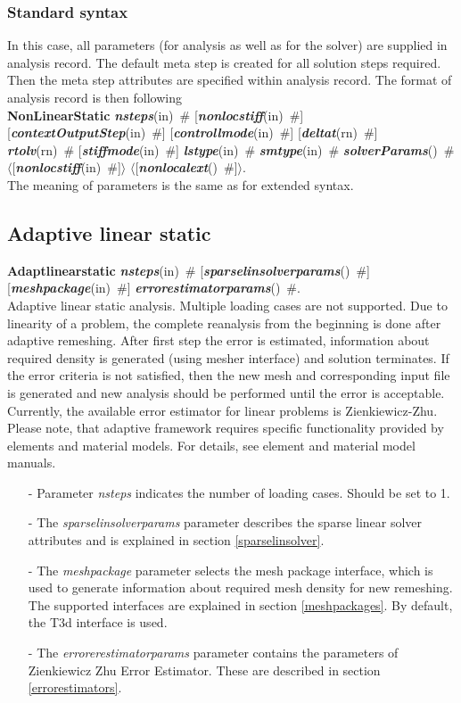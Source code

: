 \documentclass[draft]{article}
\newcommand{\param}[1]{{\em #1}}
\newcommand{\keywordnotype}[1]{\mbox{{\it{\bf{#1}}}}}
\newcommand{\keyword}[2]{\mbox{{\keywordnotype{#1}\tiny (#2)}}}
\newcommand{\entKeywordInst}[1]{\mbox{{\bf{{#1}}}}}
\newcommand{\field}[2]{\mbox{\keyword{#1}{#2}~\#}}
\newcommand{\optField}[2]{\mbox{[\field{#1}{#2}]}}
\newcommand{\PoptField}[2]{\mbox{$\langle$[\field{#1}{#2}]$\rangle$}}
\begin{document}
\subsubsection{Standard syntax}
In this case, all parameters (for analysis as well as for the solver)
are supplied in analysis record. The default meta step is created for
all solution steps required. Then the meta step attributes are
specified within analysis record. The format of analysis record is
then following\\
\entKeywordInst{NonLinearStatic} \field{nsteps}{in}
\optField{nonlocstiff}{in}\\
 \optField{contextOutputStep}{in} \optField{controllmode}{in} \optField{deltat}{rn}\\
\field{rtolv}{rn} \optField{stiffmode}{in} \field{lstype}{in}
\field{smtype}{in} \field{solverParams}{}\\
\PoptField{nonlocstiff}{in} \PoptField{nonlocalext}{}.\\ The
meaning of parameters is the same as for extended syntax.

%
\subsection{Adaptive linear static}
\label{AdaptiveLinearStatic}
\entKeywordInst{Adaptlinearstatic} \field{nsteps}{in}
\optField{sparselinsolverparams}{} \\\optField{meshpackage}{in} \field{errorestimatorparams}{}.\\
Adaptive linear static analysis. Multiple loading cases are not
supported. Due to linearity of a problem, the complete reanalysis from
the beginning is done after adaptive remeshing.
After first step the error is estimated, information about required density is generated
(using mesher interface) and solution terminates. If the error
criteria is not satisfied, then the new mesh
and corresponding input file is generated and new analysis should be
performed until the error is acceptable.
Currently, the available error estimator for linear problems is
Zienkiewicz-Zhu. Please note, that adaptive framework requires
specific functionality provided by elements and material models. For
details, see element and material model manuals.
\begin{itemize}
\item[-]
Parameter \param{nsteps} indicates the number of loading cases.
Should be set to 1.
\item[-]
The  \param{sparselinsolverparams} parameter describes the sparse
linear solver attributes and is explained in section \ref{sparselinsolver}.
\item[-]
The \param{meshpackage} parameter selects the mesh package interface,
which is used to generate information about required mesh density for
new remeshing. The supported interfaces are explained in section
\ref{meshpackages}. By default, the T3d interface is used.
\item[-]
The \param{errorerestimatorparams} parameter contains the parameters
of Zien\-kie\-wicz Zhu Error Estimator. These are described in section \ref{errorestimators}.
\end{itemize}
\end{document}
